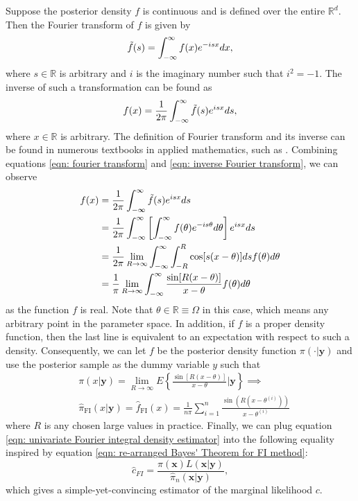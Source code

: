 \documentclass[%
 reprint,
 amsmath,amssymb,
 aps,
]{revtex4-2}
\def\R{\mathbb{R}}
\def\ybold{\mathbf{y}}
\def\xbold{\mathbf{x}}
\begin{document}
Suppose the posterior density $f$ is continuous and is defined over the entire $\R^d$. Then the Fourier transform of $f$ is given by
\begin{equation} \label{eqn: fourier transform}
    \Tilde{f}(s) = \int_{-\infty}^\infty f(x) e^{-isx}dx,
\end{equation}
where $s \in \R$ is arbitrary and $i$ is the imaginary number such that $i^2 = -1$. The inverse of such a transformation can be found as
\begin{equation} \label{eqn: inverse Fourier transform}
    f(x) = \frac{1}{2\pi}\int_{-\infty}^\infty \Tilde{f}(s) e^{isx}ds,
\end{equation}
where $x \in \R$ is arbitrary. The definition of Fourier transform and its inverse can be found in numerous textbooks in applied mathematics, such as \cite{pristley2005introduction}. Combining equations \eqref{eqn: fourier transform} and \eqref{eqn: inverse Fourier transform}, we can observe
\begin{align} \label{eqn: univariate Fourier integral}
    f(x) & = \frac{1}{2\pi}\int_{-\infty}^\infty \Tilde{f}(s) e^{isx}ds \\
    & = \frac{1}{2\pi}\int_{-\infty}^\infty \left[\int_{-\infty}^\infty f(\theta) e^{-is\theta}d\theta\right] e^{isx}ds \\
    & = \frac{1}{2\pi} \lim_{R \to \infty} \int_{-\infty}^\infty \int_{-R}^R \cos[s(x-\theta)]ds f(\theta)d\theta \\
    & = \frac{1}{\pi} \lim_{R \to \infty} \int_{-\infty}^\infty \frac{\sin[R(x-\theta)]}{x-\theta}f(\theta)d\theta
\end{align}
as the function $f$ is real. Note that $\theta \in \R \equiv \Omega$ in this case, which means any arbitrary point in the parameter space. In addition, if $f$ is a proper density function, then the last line is equivalent to an expectation with respect to such a density. Consequently, we can let $f$ be the posterior density function $\pi(\cdot|\ybold)$ and use the posterior sample as the dummy variable $y$ such that
\begin{align} \label{eqn: univariate Fourier integral density estimator}
    & \pi(x|\ybold) = \lim_{R \to \infty} E\left\{\frac{\sin[R(x-\theta)]}{x-\theta} \bigg|\ybold\right\} \implies \\ & \hat{\pi}_\text{FI}(x|\ybold) = \hat{f}_\text{FI}(x) = \frac{1}{n\pi}\sum_{i = 1}^n \frac{\sin(R(x - \theta^{(i)}))}{x - \theta^{(i)}}
\end{align}
where $R$ is any chosen large values in practice. Finally, we can plug equation \eqref{eqn: univariate Fourier integral density estimator} into the following equality inspired by equation \eqref{eqn: re-arranged Bayes' Theorem for FI method}:
\begin{equation} \label{eqn: re-arranged Bayes' Theorem for FI method estimator}
    \hat{c}_{FI} = \frac{\pi(\xbold)L(\xbold | \ybold)}{\hat{\pi}_n (\xbold | \ybold)},
\end{equation}
which gives a simple-yet-convincing estimator of the marginal likelihood $c$.
\end{document}
